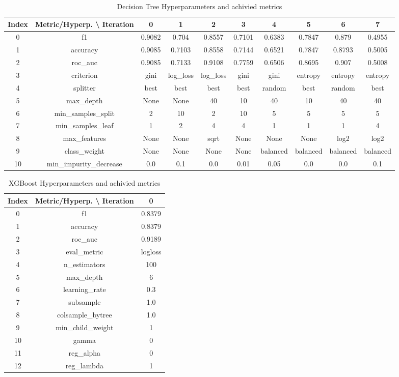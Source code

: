\documentclass{article}%
\begin{document}
%


\begin{table}[h!]%
\caption{Decision Tree Hyperparameters and achivied metrics}%
\vspace{0.2cm}%
\centering%
\begin{tabular}{|c||c||c||c||c||c||c||c||c||c|}%
\hline%
Index&Metric/Hyperp. \textbackslash{} Iteration&0&1&2&3&4&5&6&7\\%
\hline%
0&f1&0.9082&0.704&0.8557&0.7101&0.6383&0.7847&0.879&0.4955\\%
1&accuracy&0.9085&0.7103&0.8558&0.7144&0.6521&0.7847&0.8793&0.5005\\%
2&roc\_auc&0.9085&0.7133&0.9108&0.7759&0.6506&0.8695&0.907&0.5008\\%
3&criterion&gini&log\_loss&log\_loss&gini&gini&entropy&entropy&entropy\\%
4&splitter&best&best&best&best&random&best&random&best\\%
5&max\_depth&None&None&40&10&40&10&40&40\\%
6&min\_samples\_split&2&10&2&10&5&5&5&5\\%
7&min\_samples\_leaf&1&2&4&4&1&1&1&4\\%
8&max\_features&None&None&sqrt&None&None&None&log2&log2\\%
9&class\_weight&None&None&None&None&balanced&balanced&balanced&balanced\\%
10&min\_impurity\_decrease&0.0&0.1&0.0&0.01&0.05&0.0&0.0&0.1\\%
\hline%
\end{tabular}%
\end{table}

%


\begin{table}[h!]%
\caption{XGBoost Hyperparameters and achivied metrics}%
\vspace{0.2cm}%
\centering%
\begin{tabular}{|c||c||c|}%
\hline%
Index&Metric/Hyperp. \textbackslash{} Iteration&0\\%
\hline%
0&f1&0.8379\\%
1&accuracy&0.8379\\%
2&roc\_auc&0.9189\\%
3&eval\_metric&logloss\\%
4&n\_estimators&100\\%
5&max\_depth&6\\%
6&learning\_rate&0.3\\%
7&subsample&1.0\\%
8&colsample\_bytree&1.0\\%
9&min\_child\_weight&1\\%
10&gamma&0\\%
11&reg\_alpha&0\\%
12&reg\_lambda&1\\%
\hline%
\end{tabular}%
\end{table}
\end{document}

